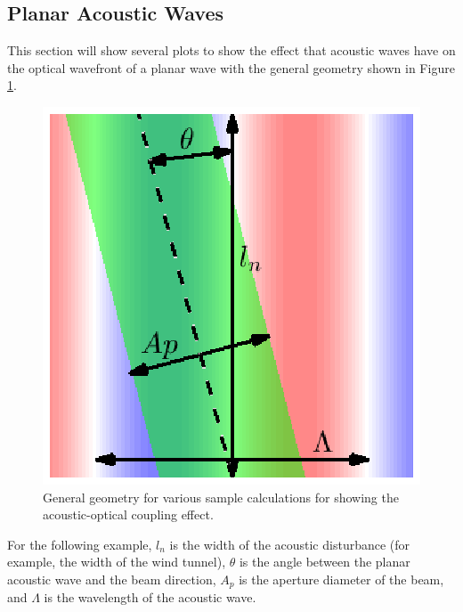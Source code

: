 \subsection{Planar Acoustic Waves}
This section will show several plots to show the effect that acoustic waves have on the optical wavefront of a planar wave with the general geometry shown in Figure \ref{fig:03_planar_sample_domain}.
\begin{figure}
  \centering
  \includegraphics{../matlab/03_aero_optics_acoustics/planar_sample_domain.eps}
  \caption{General geometry for various sample calculations for showing the acoustic-optical coupling effect.}
  \label{fig:03_planar_sample_domain}
\end{figure}
For the following example, $l_n$ is the width of the acoustic disturbance (for example, the width of the wind tunnel), $\theta$ is the angle between the planar acoustic wave and the beam direction, $A_p$ is the aperture diameter of the beam, and $\Lambda$ is the wavelength of the acoustic wave.

